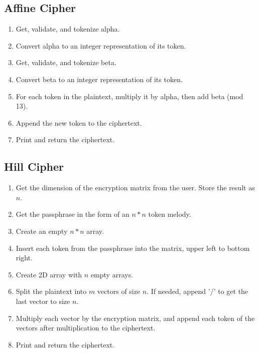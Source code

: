 \documentclass[14pt]{article}
\begin{document}
    	\subsection{Affine Cipher}
        \begin{enumerate}
            \item Get, validate, and tokenize alpha.
            \item Convert alpha to an integer representation of its token.
            \item Get, validate, and tokenize beta.
            \item Convert beta to an integer representation of its token.
            \item For each token in the plaintext, multiply it by alpha, then add beta (mod 13).
            \item Append the new token to the ciphertext.
            \item Print and return the ciphertext.
        \end{enumerate}
        
    	\subsection{Hill Cipher}
        \begin{enumerate}
            \item Get the dimension of the encryption matrix from the user. Store the result as $n$.
            \item Get the passphrase in the form of an $n * n$ token melody.
            \item Create an empty $n * n$ array.
            \item Insert each token from the passphrase into the matrix, upper left to bottom right.
            \item Create 2D array with $n$ empty arrays.
            \item Split the plaintext into $m$ vectors of size $n$. If needed, append '/' to get the last vector to size $n$.
            \item Multiply each vector by the encryption matrix, and append each token of the vectors after multiplication to the ciphertext.
            \item Print and return the ciphertext.
        \end{enumerate}
        
\end{document}
